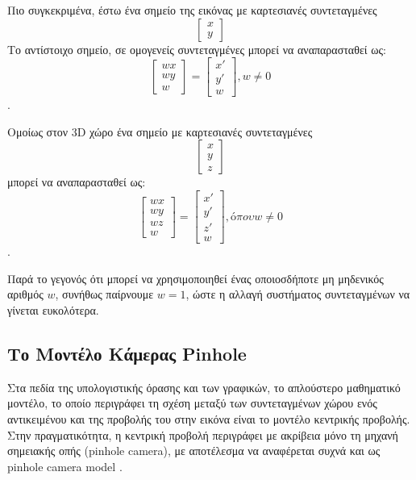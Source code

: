 Πιο συγκεκριμένα, έστω ένα σημείο της εικόνας με καρτεσιανές συντεταγμένες \[\begin{bmatrix} x \\ y \end{bmatrix}\]
Το αντίστοιχο σημείο, σε ομογενείς συντεταγμένες μπορεί να αναπαρασταθεί ως: \[\begin{bmatrix} wx \\ wy \\ w\end{bmatrix}=
\begin{bmatrix}x'\\y'\\w\end{bmatrix} , w\neq0 \].

Ομοίως στον 3D χώρο ένα σημείο με καρτεσιανές συντεταγμένες \[\begin{bmatrix} x \\ y \\ z \end{bmatrix}\] μπορεί να αναπαρασταθεί ως: \[\begin{bmatrix} wx \\ wy \\ wz \\ w\end{bmatrix}=
\begin{bmatrix}x'\\y'\\z' \\ w\end{bmatrix} , όπου w\neq0 \].


Παρά το γεγονός ότι μπορεί να χρησιμοποιηθεί ένας οποιοσδήποτε μη μηδενικός αριθμός $w$, συνήθως παίρνουμε $w=1$, ώστε η αλλαγή συστήματος συντεταγμένων να γίνεται ευκολότερα.





\subsection{Το Μοντέλο Κάμερας Pinhole}



Στα πεδία της υπολογιστικής όρασης και των γραφικών, το απλούστερο μαθηματικό μοντέλο, το οποίο περιγράφει τη σχέση μεταξύ των συντεταγμένων χώρου ενός αντικειμένου και της προβολής του στην εικόνα είναι το μοντέλο κεντρικής προβολής. Στην πραγματικότητα, η κεντρική προβολή περιγράφει με ακρίβεια μόνο τη μηχανή σημειακής οπής (pinhole camera), με αποτέλεσμα να αναφέρεται συχνά και ως pinhole camera model \cite{hartley2003multiple} .


